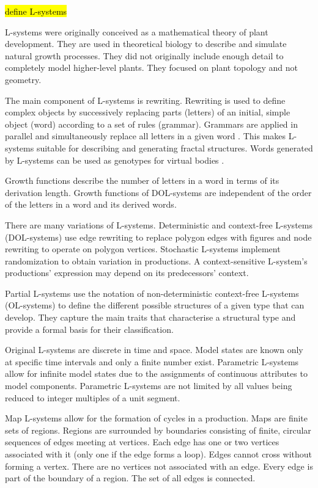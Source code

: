 \hl{define L-systems}

L-systems were originally conceived as a mathematical theory of plant development. They are used in theoretical biology to describe and simulate natural growth processes. They did not originally include enough detail to completely model higher-level plants. They focused on plant topology and not geometry. \cite{Kolodziej2002,Prusinkiewicz2004}

The main component of L-systems is rewriting. Rewriting is used to define complex objects by successively replacing parts (letters) of an initial, simple object (word) according to a set of rules (grammar). Grammars are applied in parallel and simultaneously replace all letters in a given word \cite{Prusinkiewicz2004}. This makes L-systems suitable for describing and generating fractal structures. Words generated by L-systems can be used as genotypes for virtual bodies \cite{Kolodziej2002}.

Growth functions describe the number of letters in a word in terms of its derivation length. Growth functions of DOL-systems are independent of the order of the letters in a word and its derived words. \cite{Prusinkiewicz2004}

There are many variations of L-systems. Deterministic and context-free L-systems (DOL-systems) use edge rewriting to replace polygon edges with figures and node rewriting to operate on polygon vertices. Stochastic L-systems implement randomization to obtain variation in productions. A context-sensitive L-system's productions' expression may depend on its predecessors' context.  \cite{Prusinkiewicz2004}

Partial L-systems use the notation of non-deterministic context-free L-systems (OL-systems) to define the different possible structures of a given type that can develop. They capture the main traits that characterise a structural type and provide a formal basis for their classification. \cite{Prusinkiewicz2004}

Original L-systems are discrete in time and space. Model states are known only at specific time intervals and only a finite number exist. Parametric L-systems allow for infinite model states due to the assignments of continuous attributes to model components. Parametric L-systems are not limited by all values being reduced to integer multiples of a unit segment. \cite{Prusinkiewicz2004}

Map L-systems allow for the formation of cycles in a production. Maps are finite sets of regions. Regions are surrounded by boundaries consisting of finite, circular sequences of edges meeting at vertices. Each edge has one or two vertices associated with it (only one if the edge forms a loop). Edges cannot cross without forming a vertex. There are no vertices not associated with an edge. Every edge is part of the boundary of a region. The set of all edges is connected. \cite{Prusinkiewicz2004}

